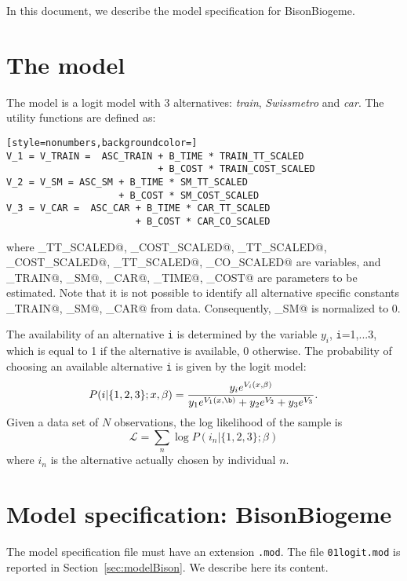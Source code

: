 \documentclass[12pt,a4paper]{article}
\renewcommand{\L}{\mathcal{L}}
\newcommand{\BBIOGEME}{BisonBiogeme}
\begin{document}
In this document, we describe the model
specification for \BBIOGEME.

\section{The model}
The model is a logit model with 3 alternatives: \emph{train}, \emph{Swissmetro} and \emph{car}. The utility functions are defined as:
\begin{lstlisting}[style=nonumbers,backgroundcolor=]
V_1 = V_TRAIN =  ASC_TRAIN + B_TIME * TRAIN_TT_SCALED 
                           + B_COST * TRAIN_COST_SCALED
V_2 = V_SM = ASC_SM + B_TIME * SM_TT_SCALED 
                    + B_COST * SM_COST_SCALED
V_3 = V_CAR =  ASC_CAR + B_TIME * CAR_TT_SCALED 
                       + B_COST * CAR_CO_SCALED
\end{lstlisting}
where 
\lstinline@TRAIN_TT_SCALED@,
\lstinline@TRAIN_COST_SCALED@,
\lstinline@SM_TT_SCALED@,
\lstinline@SM_COST_SCALED@,
\lstinline@CAR_TT_SCALED@,
\lstinline@CAR_CO_SCALED@
are variables, and 
  \lstinline@ASC_TRAIN@,
  \lstinline@ASC_SM@,
  \lstinline@ASC_CAR@,
  \lstinline@B_TIME@,
  \lstinline@B_COST@ are parameters to be estimated. Note that it is not possible to identify all alternative specific constants  
  \lstinline@ASC_TRAIN@,
  \lstinline@ASC_SM@,
  \lstinline@ASC_CAR@ from data. Consequently,  \lstinline@ASC_SM@ is normalized to 0. 

The availability of an alternative \texttt{i} is determined by the
variable $y_i$, \texttt{i}=1,...3, which is equal to 1 if the
alternative is available, 0 otherwise. The probability of choosing an
available alternative \texttt{i} is given by the logit model: 
\begin{equation}
P(i|\{1,2,3\};x,\beta) = \frac{y_i e^{V_i(x,\beta)}}{y_1 e^{V_1(x,\b)} + y_2 e^{V_2}+ y_3 e^{V_3}}.
\end{equation}
Given a data set of $N$ observations, the log likelihood of the
sample is 
\begin{equation}
\L = \sum_n \log P(i_n|\{1,2,3\};\beta)
\end{equation}
where $i_n$ is the alternative actually chosen
by individual $n$.  

\section{Model specification: \BBIOGEME}
\label{sec:mod}

The model specification file must have an extension \lstinline$.mod$. 
The file \lstinline$01logit.mod$ is reported in
Section~\ref{sec:modelBison}. We describe here its content. 
\end{document}
